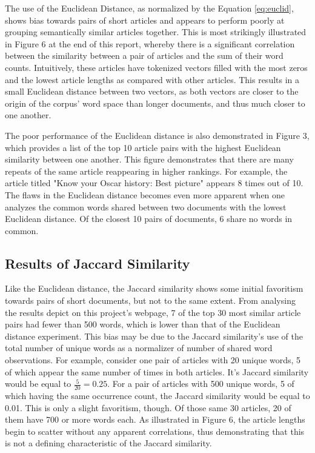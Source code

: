 \documentclass[11pt]{article}
\begin{document}
The use of the Euclidean Distance, as normalized by the Equation \ref{eq:euclid}, shows bias towards pairs of short articles and appears to perform poorly at grouping semantically similar articles together.
This is most strikingly illustrated in Figure 6 at the end of this report, whereby there is a significant correlation between the similarity between a pair of articles and the sum of their word counts.
Intuitively, these articles have tokenized vectors filled with the most zeros and the lowest article lengths as compared with other articles.
This results in a small Euclidean distance between two vectors, as both vectors are closer to the origin of the corpus' word space than longer documents, and thus much closer to one another.

The poor performance of the Euclidean distance is also demonstrated in Figure 3, which provides a list of the top 10 article pairs with the highest Euclidean similarity between one another.
This figure demonstrates that there are many repeats of the same article reappearing in higher rankings.
For example, the article titled "Know your Oscar history: Best picture" appears 8 times out of 10.
The flaws in the Euclidean distance becomes even more apparent when one analyzes the common words shared between two documents with the lowest Euclidean distance.
Of the closest 10 pairs of documents, 6 share no words in common.


\subsection{Results of Jaccard Similarity}

Like the Euclidean distance, the Jaccard similarity shows some initial favoritism towards pairs of short documents, but not to the same extent.
From analysing the results depict on this project's webpage, 7 of the top 30 most similar article pairs had fewer than 500 words, which is lower than that of the Euclidean distance experiment.
This bias may be due to the Jaccard similarity's use of the total number of unique words as a normalizer of number of shared word observations.
For example, consider one pair of articles with 20 unique words, 5 of which appear the same number of times in both articles.
It's Jaccard similarity would be equal to $\frac{5}{20} = 0.25$.
For a pair of articles with 500 unique words, 5 of which having the same occurrence count, the Jaccard similarity would be equal to 0.01.
This is only a slight favoritism, though.
Of those same 30 articles, 20 of them have 700 or more words each.
As illustrated in Figure 6, the article lengths begin to scatter without any apparent correlations, thus demonstrating that this is not a defining characteristic of the Jaccard similarity.
\end{document}
